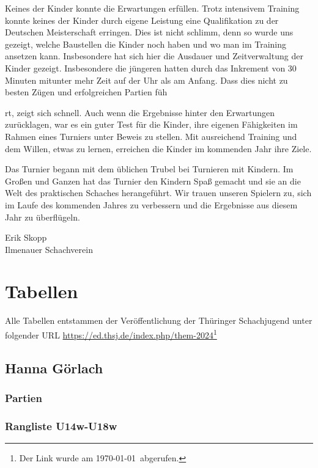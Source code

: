 \documentclass[a4paper,ngerman]{tui-algo-seminar}
\begin{document}
Keines der Kinder konnte die Erwartungen erfüllen. Trotz intensivem Training konnte keines der Kinder durch eigene Leistung eine Qualifikation zu der Deutschen Meisterschaft erringen. Dies ist nicht schlimm, denn so wurde uns gezeigt, welche Baustellen die Kinder noch haben und wo man im Training ansetzen kann. Insbesondere hat sich hier die Ausdauer und Zeitverwaltung der Kinder gezeigt. Insbesondere die jüngeren hatten durch das Inkrement von 30 Minuten mitunter mehr Zeit auf der Uhr als am Anfang. Dass dies nicht zu besten Zügen und erfolgreichen Partien füh

rt, zeigt sich schnell. Auch wenn die Ergebnisse hinter den Erwartungen zurücklagen, war es ein guter Test für die Kinder, ihre eigenen Fähigkeiten im Rahmen eines Turniers unter Beweis zu stellen. Mit ausreichend Training und dem Willen, etwas zu lernen, erreichen die Kinder im kommenden Jahr ihre Ziele.

Das Turnier begann mit dem üblichen Trubel bei Turnieren mit Kindern. Im Großen und Ganzen hat das Turnier den Kindern Spaß gemacht und sie an die Welt des praktischen Schaches herangeführt. Wir trauen unseren Spielern zu, sich im Laufe des kommenden Jahres zu verbessern und die Ergebnisse aus diesem Jahr zu überflügeln.


\vspace{2cm}
Erik Skopp\\
Ilmenauer Schachverein\\
\clearpage


\section{Tabellen}
Alle Tabellen entstammen der Veröffentlichung der Thüringer Schachjugend unter folgender URL \url{https://ed.thsj.de/index.php/them-2024}\footnote{Der Link wurde am \today ~abgerufen.}

\subsection{Hanna Görlach}
    \subsubsection{Partien}
        
    \subsubsection{Rangliste U14w-U18w}
        
\clearpage
\end{document}
